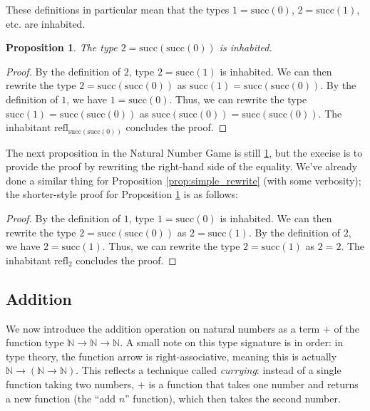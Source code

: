 \documentclass[12pt]{article}
\newtheorem{proposition}{Proposition}[section]
\theoremstyle{definition}
\theoremstyle{remark}
\newcommand{\doublequotes}[1]{``#1''}
\begin{document}
These definitions in particular mean that the types $1 = \text{succ}(0)$, $2 = \text{succ}(1)$, etc. are inhabited.

\begin{proposition}\label{prop:two_is_succ_of_succ_of_zero}
  The type $2 = \text{succ}(\text{succ}(0))$ is inhabited.
\end{proposition}
\begin{proof}
  By the definition of $2$, type $2 = \text{succ}(1)$ is inhabited. We can then rewrite the type $2 = \text{succ}(\text{succ}(0))$ as $\text{succ}(1) = \text{succ}(\text{succ}(0))$. By the definition of $1$, we have $1 = \text{succ}(0)$. Thus, we can rewrite the type $\text{succ}(1) = \text{succ}(\text{succ}(0))$ as $\text{succ}(\text{succ}(0)) = \text{succ}(\text{succ}(0))$.
  The inhabitant $\text{refl}_{\text{succ}(\text{succ}(0))}$ concludes the proof.
\end{proof}

The next proposition in the Natural Number Game is still \ref{prop:two_is_succ_of_succ_of_zero}, but the execise is to provide the proof by rewriting the right-hand side of the equality. We've already done a similar thing for Proposition \ref{prop:simple_rewrite} (with some verbosity); the shorter-style proof for Proposition \ref{prop:two_is_succ_of_succ_of_zero} is as follows:

\begin{proof}
  By the definition of $1$, type $1 = \text{succ}(0)$ is inhabited. We can then rewrite the type $2 = \text{succ}(\text{succ}(0))$ as $2 = \text{succ}(1)$. By the definition of $2$, we have $2 = \text{succ}(1)$. Thus, we can rewrite the type $2 = \text{succ}(1)$ as $2 = 2$.
  The inhabitant $\text{refl}_{2}$ concludes the proof.
\end{proof}

\subsection{Addition}

We now introduce the addition operation on natural numbers as a term $+$ of the function type $\mathbb{N} \to \mathbb{N} \to \mathbb{N}$. A small note on this type signature is in order: in type theory, the function arrow is right-associative, meaning this is actually $\mathbb{N} \to (\mathbb{N} \to \mathbb{N})$. This reflects a technique called \textit{currying}: instead of a single function taking two numbers, $+$ is a function that takes one number and returns a new function (the \doublequotes{add $n$} function), which then takes the second number.
\end{document}
